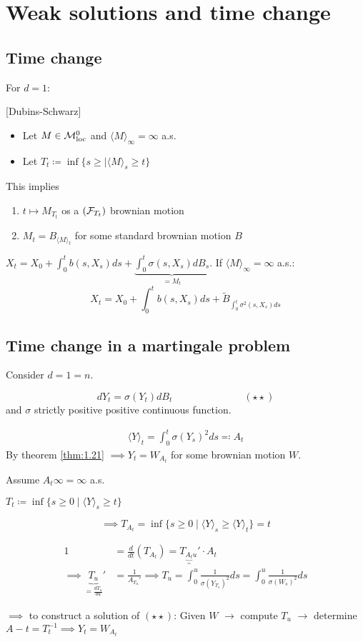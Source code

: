 \section{Weak solutions and time change}

\subsection{Time change}

For $d=1$:

\begin{theorem}\label{thm:1.21}[Dubins-Schwarz]
    \begin{itemize}
        \item Let $M\in\mathcal{M}_{\text{loc}}^0$ and $\langle M\rangle_\infty=\infty$ a.s. 
        \item Let $T_t\coloneqq \inf\{s\geq |\langle M\rangle_s \geq t\}$
    \end{itemize}
    This implies    
    \begin{enumerate}
        \item $t\mapsto M_{T_t}$ os a $(\mathcal{F}_{T_t})$ brownian motion
        \item $M_t=B_{\langle M\rangle_t}$ for some standard brownian motion $B$
    \end{enumerate}
\end{theorem}

$X_t=X_0+\int_0^t b(s,X_s)ds+\underbrace{\int_0^t \sigma(s,X_s)dB_s}_{=M_t}$.
If $\langle M\rangle_\infty=\infty$ a.s.:
\[X_t=X_0+\int_0^tb(s,X_s)ds+\tilde{B}_{\int_0^t \sigma^2(s,X_s)ds}\]

\subsection{Time change in a martingale problem}

Consider $d=1=n$.

\[dY_t=\sigma(Y_t)dB_t \hspace{3cm}(\star\star)\]
and $\sigma$ strictly positive positive continuous function.

\begin{align*}
    \langle Y\rangle_t=\int_0^t\sigma(Y_s)^2 ds\eqqcolon A_t
\end{align*}
By theorem \ref{thm:1.21} $\implies Y_t=W_{A_t}$ for some brownian motion $W$.

Assume $A_t\infty=\infty$ a.s.

$T_t\coloneqq \inf\{s\geq 0\mid \langle Y\rangle_s \geq t\}$

\[\implies T_{A_t}=\inf\{s\geq 0\mid \langle Y\rangle_s\geq \langle Y\rangle_t\}=t\]

\begin{align*}
    1&=\frac{d}{dt}\left(T_{A_t}\right)=T_{\underbrace{A_t}_=u}'\cdot A_t\\
    \implies \underbrace{T_u}_{=\frac{dT_u}{du}}'&=\frac{1}{A_{T_u}'} \implies T_u = \int_0^u \frac{1}{\sigma(Y_{T_s})^2}ds=\int_0^u \frac{1}{\sigma(W_s)^2}ds
\end{align*}

$\implies$ to construct a solution of $(\star\star)$: Given $W$ $\longrightarrow$ compute $T_u$ $\longrightarrow$ determine $A-t=T_t^{-1}\implies Y_t=W_{A_t}$